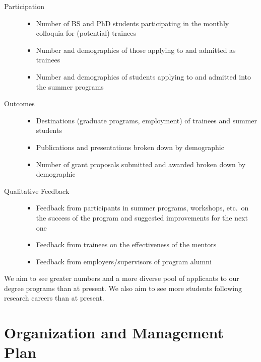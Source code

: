 \documentclass[11pt]{NSFamsart}
\begin{document}
\begin{description}
	\item[Participation] \phantom{a}
	\begin{itemize}
		\item Number of BS and PhD students participating in the monthly colloquia for (potential) trainees
		\item Number and demographics of those applying to and admitted as trainees
		\item Number and demographics of students applying to and admitted into the summer programs
	\end{itemize}
	\item[Outcomes] \phantom{a}
	\begin{itemize}
		\item Destinations (graduate programs, employment) of trainees and summer students
		\item Publications and presentations broken down by demographic
		\item Number of grant proposals submitted and awarded broken down by demographic
	\end{itemize}
	\item[Qualitative Feedback] \phantom{a}
\begin{itemize}
\item Feedback from participants in summer programs, workshops, etc.\ on the success of the program and suggested improvements for the next one
\item Feedback from trainees on the effectiveness of the mentors
\item Feedback from employers/supervisors of program alumni
\end{itemize}
\end{description}
We aim to see greater numbers and a more diverse pool of  applicants to our degree programs than at present.  We also aim to see more students following research careers than at present.  
 


\section{Organization and Management Plan }
 
\end{document}
